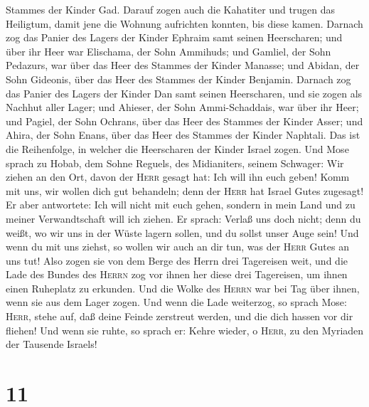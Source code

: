 Stammes der Kinder Gad.  Darauf zogen auch die Kahatiter
und trugen das Heiligtum, damit jene die Wohnung aufrichten konnten, bis
diese kamen.  Darnach zog das Panier des Lagers der
Kinder Ephraim samt seinen Heerscharen; und über ihr Heer war Elischama,
der Sohn Ammihuds;  und Gamliel, der Sohn Pedazurs, war
über das Heer des Stammes der Kinder Manasse;  und
Abidan, der Sohn Gideonis, über das Heer des Stammes der Kinder
Benjamin.  Darnach zog das Panier des Lagers der Kinder
Dan samt seinen Heerscharen, und sie zogen als Nachhut aller Lager; und
Ahieser, der Sohn Ammi-Schaddais, war über ihr Heer;  und
Pagiel, der Sohn Ochrans, über das Heer des Stammes der Kinder Asser;
 und Ahira, der Sohn Enans, über das Heer des Stammes der
Kinder Naphtali.  Das ist die Reihenfolge, in welcher die
Heerscharen der Kinder Israel zogen.  Und Mose sprach zu
Hobab, dem Sohne Reguels, des Midianiters, seinem Schwager: Wir ziehen
an den Ort, davon der \textsc{Herr} gesagt hat: Ich will ihn euch geben!
Komm mit uns, wir wollen dich gut behandeln; denn der \textsc{Herr} hat
Israel Gutes zugesagt!  Er aber antwortete: Ich will
nicht mit euch gehen, sondern in mein Land und zu meiner Verwandtschaft
will ich ziehen.  Er sprach: Verlaß uns doch nicht; denn
du weißt, wo wir uns in der Wüste lagern sollen, und du sollst unser
Auge sein!  Und wenn du mit uns ziehst, so wollen wir
auch an dir tun, was der \textsc{Herr} Gutes an uns tut! 
Also zogen sie von dem Berge des Herrn drei Tagereisen weit, und die
Lade des Bundes des \textsc{Herrn} zog vor ihnen her diese drei
Tagereisen, um ihnen einen Ruheplatz zu erkunden.  Und
die Wolke des \textsc{Herrn} war bei Tag über ihnen, wenn sie aus dem
Lager zogen.  Und wenn die Lade weiterzog, so sprach
Mose: \textsc{Herr}, stehe auf, daß deine Feinde zerstreut werden, und
die dich hassen vor dir fliehen!  Und wenn sie ruhte, so
sprach er: Kehre wieder, o \textsc{Herr}, zu den Myriaden der Tausende
Israels!

\hypertarget{section-10}{%
\section{11}\label{section-10}}

